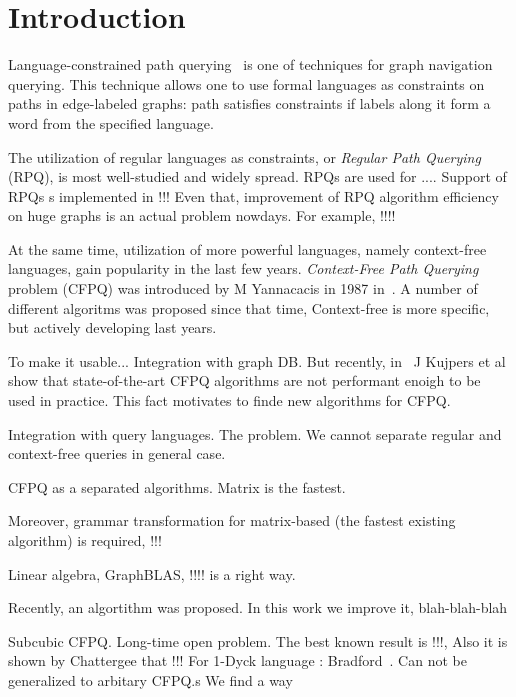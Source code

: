 \section{Introduction}


Language-constrained path querying~\cite{!!!} is one of techniques for graph navigation querying. 
This technique allows one to use formal languages as constraints on paths in edge-labeled graphs: path satisfies constraints if labels along it form a word from the specified language.

The utilization of regular languages as constraints, or \textit{Regular Path Querying} (RPQ), is most well-studied and widely spread.
RPQs are used for .... 
Support of RPQs s implemented in !!!
Even that, improvement of RPQ algorithm efficiency on huge graphs is an actual problem nowdays.
For example, !!!!

At the same time, utilization of more powerful languages, namely context-free languages, gain popularity in the last few years. 
\textit{Context-Free Path Querying} problem (CFPQ) was introduced by M Yannacacis in 1987 in~\cite{!!!}.
A number of different algoritms was proposed since that time, 
Context-free is more specific, but actively developing last years.


To make it usable... Integration with graph DB.
But recently, in~\cite{!!!} J Kujpers et al show that state-of-the-art CFPQ algorithms are not performant enoigh to be used in practice.
This fact motivates to finde new algorithms for CFPQ.

Integration with query languages. 
The problem. We cannot separate regular and context-free queries in general case.  

CFPQ as a separated algorithms. 
Matrix is the fastest. 

Moreover, grammar transformation for matrix-based (the fastest existing algorithm) is required, !!!

Linear algebra, GraphBLAS, !!!! is a right way.

Recently, an algortithm was proposed. In this work we improve it, blah-blah-blah

Subcubic CFPQ. Long-time open problem. 
The best known result is !!!, 
Also it is shown by Chattergee that !!!
For 1-Dyck language : Bradford~\cite{!!!}. Can not be generalized to arbitary CFPQ.s 
We find a way

